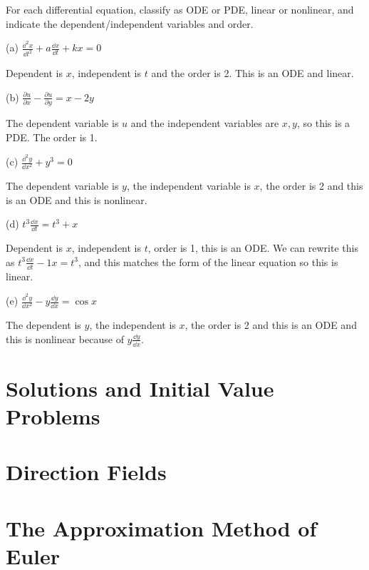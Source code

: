 \documentclass[../diffeq.tex]{subfiles}
\begin{document}
\begin{example}
    For each differential equation, classify as ODE or PDE, linear or nonlinear, and indicate the dependent/independent variables and order.

    (a) $\frac{\dd^2 x}{\dd t^2}+a\frac{\dd x}{\dd t}+kx =0$

    Dependent is $x$, independent is $t$ and the order is 2. This is an ODE and linear.

    (b) $\frac{\partial u}{\partial x} - \frac{\partial u}{\partial y}=x-2y$ 

    The dependent variable is $u$ and the independent variables are $x,y$, so this is a PDE. The order is 1.

    (c) $\frac{\dd^2 y}{\dd x^2}+y^3=0$

    The dependent variable is $y$, the independent variable is $x$, the order is 2 and this is an ODE and this is nonlinear.

    (d) $t^3 \frac{\dd x}{\dd t} = t^3+x$

    Dependent is $x$, independent is $t$, order is 1, this is an ODE. We can rewrite this as $t^3\frac{\dd x}{\dd t}-1x=t^3$, and this matches the form of the linear equation so this is linear.

    (e) $\frac{\dd^2 y}{\dd x^2} - y\frac{\dd y}{\dd x}=\cos x$

    The dependent is $y$, the independent is $x$, the order is 2 and this is an ODE and this is nonlinear because of $y\frac{\dd y}{\dd x}$.
\end{example}

\section{Solutions and Initial Value Problems}
\section{Direction Fields}
\section{The Approximation Method of Euler}
\end{document}
